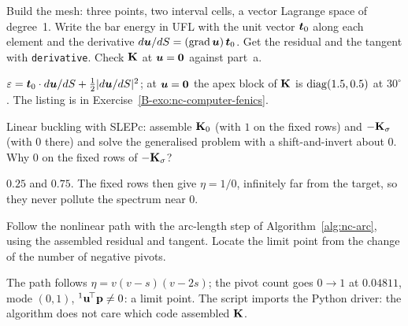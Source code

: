 \qc Build the mesh: three points, two interval cells, a vector Lagrange space of degree~1.
Write the bar energy in UFL with the unit vector $\bm{t}_0$ along each element and the
derivative $d\bm{u}/dS = (\operatorname{grad}\bm{u})\,\bm{t}_0$. Get the residual and the tangent with
\texttt{derivative}. Check $\mathbf{K}$ at $\bm{u} = \bm{0}$ against part~a.
\begin{answer}
$\varepsilon = \bm{t}_0\cdot d\bm{u}/dS + \tfrac12\lvert d\bm{u}/dS\rvert^2$; at $\bm{u} = \bm{0}$ the apex block of
$\mathbf{K}$ is $\operatorname{diag}(1.5, 0.5)$ at $30^\circ$. The listing is in Exercise~\ref{B-exo:nc-computer-fenics}.
\end{answer}

\qc Linear buckling with SLEPc: assemble $\mathbf{K}_0$ (with $1$ on the fixed rows) and
$-\mathbf{K}_\sigma$ (with $0$ there) and solve the generalised problem with a shift-and-invert
about $0$. Why $0$ on the fixed rows of $-\mathbf{K}_\sigma$?
\begin{answer}
$0.25$ and $0.75$. The fixed rows then give $\eta = 1/0$, infinitely far from the target, so
they never pollute the spectrum near $0$.
\end{answer}

\qc Follow the nonlinear path with the arc-length step of Algorithm~\ref{alg:nc-arc}, using the
assembled residual and tangent. Locate the limit point from the change of the number of
negative pivots.
\begin{answer}
The path follows $\eta = v(v - s)(v - 2s)$; the pivot count goes $0\to1$ at $0.04811$, mode
$(0,1)$, ${}^1\mathbf{u}^{\!\top}\mathbf{p} \neq 0$: a limit point. The script imports the Python driver: the
algorithm does not care which code assembled $\mathbf{K}$.
\end{answer}

